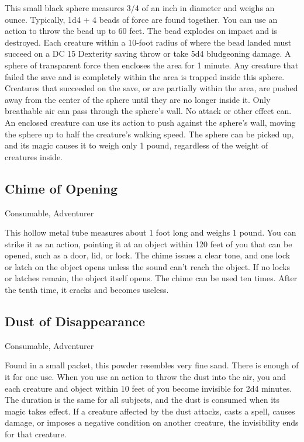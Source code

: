 This small black sphere measures 3/4 of an inch in diameter and weighs an ounce. Typically, 1d4 + 4 beads of force are found together.  You can use an action to throw the bead up to 60 feet. The bead explodes on impact and is destroyed. Each creature within a 10-foot radius of where the bead landed must succeed on a DC 15 Dexterity saving throw or take 5d4 bludgeoning damage. A sphere of transparent force then encloses the area for 1 minute. Any creature that failed the save and is completely within the area is trapped inside this sphere. Creatures that succeeded on the save, or are partially within the area, are pushed away from the center of the sphere until they are no longer inside it. Only breathable air can pass through the sphere's wall. No attack or other effect can. An enclosed creature can use its action to push against the sphere's wall, moving the sphere up to half the creature's walking speed. The sphere can be picked up, and its magic causes it to weigh only 1 pound, regardless of the weight of creatures inside.

\subsection{Chime of Opening}
Consumable, Adventurer

This hollow metal tube measures about 1 foot long and weighs 1 pound. You can strike it as an action, pointing it at an object within 120 feet of you that can be opened, such as a door, lid, or lock. The chime issues a clear tone, and one lock or latch on the object opens unless the sound can't reach the object. If no locks or latches remain, the object itself opens. The chime can be used ten times. After the tenth time, it cracks and becomes useless.

\subsection{Dust of Disappearance}
Consumable, Adventurer

Found in a small packet, this powder resembles very fine sand. There is enough of it for one use. When you use an action to throw the dust into the air, you and each creature and object within 10 feet of you become invisible for 2d4 minutes. The duration is the same for all subjects, and the dust is consumed when its magic takes effect. If a creature affected by the dust attacks, casts a spell, causes damage, or imposes a negative condition on another creature, the invisibility ends for that creature.

